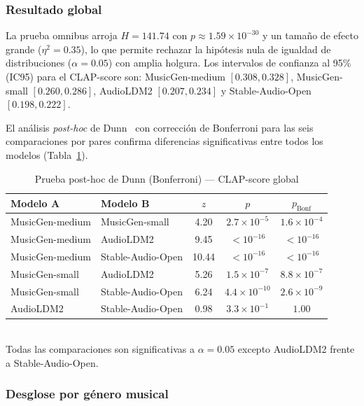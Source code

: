 \subsubsection{Resultado global}

La prueba omnibus arroja $H = 141.74$ con $p \approx 1.59 \times 10^{-30}$ y un tamaño de efecto grande ($\eta^2 = 0.35$),
lo que permite rechazar la hipótesis nula de igualdad de distribuciones
($\alpha = 0.05$) con amplia holgura. Los intervalos de confianza al 95\% (IC95) para el CLAP-score son: MusicGen-medium $[0.308, 0.328]$, MusicGen-small $[0.260, 0.286]$, AudioLDM2 $[0.207, 0.234]$ y Stable-Audio-Open $[0.198, 0.222]$.

El análisis \textit{post-hoc} de Dunn~\cite{dunn1964multiple} con corrección
de Bonferroni para las seis comparaciones por pares confirma diferencias
significativas entre todos los modelos (Tabla~\ref{tab:dunn}).

\begin{table}[t]
  \caption{Prueba post-hoc de Dunn (Bonferroni) — CLAP-score global}
  \label{tab:dunn}
  \centering
  \begin{tabular}{llccc}
    \hline
    \textbf{Modelo A} & \textbf{Modelo B} &
    \textbf{$z$} & \textbf{$p$} & \textbf{$p_{\text{Bonf}}$} \\
    \hline
    MusicGen-medium  & MusicGen-small    & 4.20 & $2.7\times10^{-5}$ & $1.6\times10^{-4}$ \\
    MusicGen-medium  & AudioLDM2         & 9.45 & $<10^{-16}$        & $<10^{-16}$         \\
    MusicGen-medium  & Stable-Audio-Open & 10.44 & $<10^{-16}$       & $<10^{-16}$         \\
    MusicGen-small   & AudioLDM2         & 5.26 & $1.5\times10^{-7}$ & $8.8\times10^{-7}$  \\
    MusicGen-small   & Stable-Audio-Open & 6.24 & $4.4\times10^{-10}$ & $2.6\times10^{-9}$  \\
    AudioLDM2        & Stable-Audio-Open & 0.98 & $3.3\times10^{-1}$ & $1.00$  \\
    \hline
  \end{tabular}
  \smallskip\\
  \footnotesize{Todas las comparaciones son significativas a $\alpha=0.05$ excepto AudioLDM2 frente a Stable-Audio-Open.}
\end{table}

\subsubsection{Desglose por género musical}

